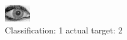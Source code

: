 \begin{figure}[h!]
\begin{center}
\includegraphics[width=0.60\columnwidth]{figures/ID1991_class_1_target_2.png}
\end{center}
\caption{ Classification: 1 actual target: 2}
\label{fig:ID1991_class_1_target_2}
\end{figure}
